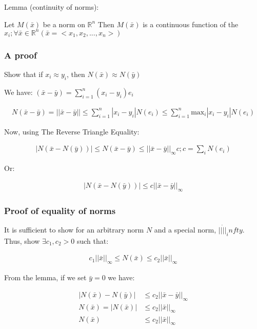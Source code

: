 Lemma (continuity of norms):

Let $M(\bar{x})$ be a norm on $\mathbb{R}^n$ Then $M(\bar{x})$ is a continuous function of the $x_i; \forall \bar{x} \in \mathbb{R}^n (\bar{x} = <x_1, x_2, ..., x_n>)$

\subsubsection{A proof}

Show that if $x_i \approx y_i$, then $N(\bar{x}) \approx N(\bar{y})$

We have: $(\bar{x} - \bar{y}) = \sum_{i=1}^{n} (x_i - y_i) e_i$

\begin{align*}
  N(\bar{x} - \bar{y}) = ||\bar{x} - \bar{y}|| \leq \sum_{i=1}^{n} |x_i - y_i| N(e_i) \leq \sum_{i=1}^{n} \text{max}_i |x_i - y_i| N(e_i)
\end{align*}

Now, using The Reverse Triangle Equality:

\begin{align*}
  |N(\bar{x} - N(\bar{y}))| \leq N(\bar{x} - \bar{y}) \leq ||\bar{x} - \bar{y}||_\infty c; c = \sum_i N(e_i)
\end{align*}

Or:

\begin{align*}
  |N(\bar{x} - N(\bar{y}))| \leq c ||\bar{x} - \bar{y}||_\infty
\end{align*}

\subsubsection{Proof of equality of norms}

It is sufficient to show for an arbitrary norm $N$ and a special norm, $||\dot||_infty$. Thus, show $\exists c_1, c_2 > 0$ such that:

\begin{align*}
  c_1 ||\bar{x}||_\infty \leq N(\bar{x}) \leq c_2 ||\bar{x}||_\infty
\end{align*}

From the lemma, if we set $\bar{y} = 0$ we have:

\begin{align*}
  |N(\bar{x}) - N(\bar{y})|  & \leq c_2 ||\bar{x} - \bar{y}||_\infty \\
  N(\bar{x}) = |N(\bar{x})| & \leq c_2 ||\bar{x}||_\infty \\
  N(\bar{x})                & \leq c_2 ||\bar{x}||_\infty
\end{align*}

